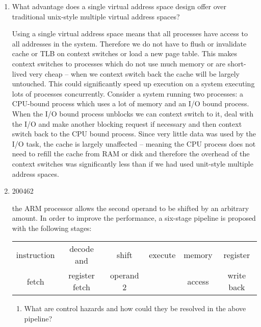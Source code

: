 \documentclass[10pt,\jkfside,a4paper]{article}
\begin{document}
\begin{enumerate}

\item What advantage does a single virtual address space design offer over
traditional unix-style multiple virtual address spaces?

Using a single virtual address space means that all processes have access to
all addresses in the system. Therefore we do not have to flush or invalidate
cache or TLB on context switches or load a new page table. This makes context
switches to processes which do not use much memory or are short-lived very
cheap -- when we context switch back the cache will be largely untouched.
This could significantly speed up execution on a system executing lots of
processes concurrently. Consider a system running two processes: a CPU-bound
process which uses a lot of memory and an I/O bound process. When the I/O
bound process unblocks we can context switch to it, deal with the I/O and
make another blocking request if necessary and then context switch back to
the CPU bound process. Since very little data was used by the I/O task, the
cache is largely unaffected -- meaning the CPU process does not need to
refill the cache from RAM or disk and therefore the overhead of the context
switches was significantly less than if we had used unit-style multiple
address spaces.

\item

\begin{examquestion}{2004}{6}{2}

the ARM processor allows the second operand to be shifted by an arbitrary
amount. In order to improve the performance, a six-stage pipeline is
proposed with the following stages:

\begin{table}[H]
\centering
\begin{tabular}{|c|c|c|c|c|c|}
\hline
instruction & decode and & shift & execute & memory & register \\
fetch & register fetch & operand 2 & & access & write back \\
\hline
\end{tabular}
\end{table}

\begin{enumerate}[label=(\alph*)]

\item What are control hazards and how could they be resolved in the above
pipeline?


\end{enumerate}
\end{examquestion}
\end{enumerate}
\end{document}
